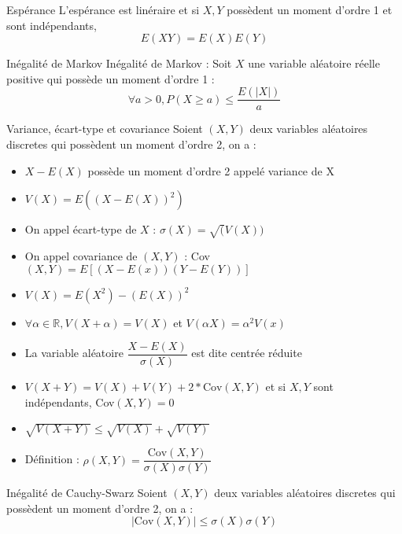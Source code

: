 \documentclass[french, a4paper, 10pt, twocolumn]{article}
\newcommand{\R}{\mathbb{R}}   %
\begin{document}
\begin{theoreme}{Espérance}
    L'espérance est linéraire et si \(X,Y\) possèdent un moment d'ordre 1 et sont indépendants,
    \[E(XY)=E(X)E(Y)\]
\end{theoreme}

\begin{theoreme}{Inégalité de Markov}
    Inégalité de Markov : Soit $X$ une variable aléatoire réelle positive qui possède un moment d'ordre 1 :
     \[\forall a>0, {P(X\geqslant a)\leqslant \frac{E(|X|)}{a}}\]
\end{theoreme}
 
\begin{definition}{Variance, écart-type et covariance}
    Soient \((X,Y)\) deux variables aléatoires discretes qui possèdent un moment d'ordre 2, on a :
    \begin{itemize}
        \item \(X-E(X)\) possède un moment d'ordre 2 appelé variance de X
        \item \(V(X)=E((X-E(X))^2)\)
        \item On appel écart-type de \(X\) : \(\sigma(X)=\sqrt(V(X))\)
        \item On appel covariance de \((X,Y)\) : Cov\((X,Y)=E[(X-E(x))(Y-E(Y))]\)
    \end{itemize}

    \tcblower
    \begin{itemize}
        \item \(V(X)=E(X^2)-(E(X))^2\)
        \item \(\forall \alpha \in \R, V(X+\alpha)=V(X)\) et \(V(\alpha X)=\alpha^2V(x)\)
        \item La variable aléatoire \(\dfrac{X-E(X)}{\sigma(X)}\) est dite centrée réduite
        \item \(V(X+Y)=V(X)+V(Y)+2*\text{Cov}(X,Y)\) et si \(X,Y\) sont indépendants, Cov\((X,Y)=0\)
        \item \(\sqrt{V(X+Y)}\leq\sqrt{V(X)}+\sqrt{V(Y)}\)
        \item Définition : \(\rho(X,Y)=\dfrac{\text{Cov}(X,Y)}{\sigma(X)\sigma(Y)}\)
    \end{itemize}
\end{definition}

\begin{theoreme}{Inégalité de Cauchy-Swarz}
    Soient \((X,Y)\) deux variables aléatoires discretes qui possèdent un moment d'ordre 2, on a :
        \[|\text{Cov}(X,Y)|\leq \sigma(X)\sigma(Y)\] 
\end{theoreme}
\end{document}
